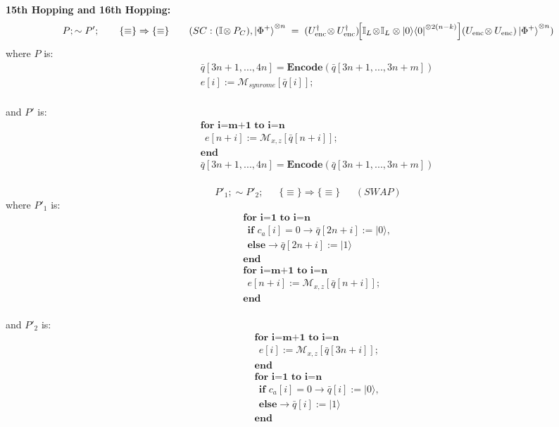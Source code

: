 \documentclass{report}
\theoremstyle{defn_style}
\begin{document}


\textbf{15th Hopping and 16th Hopping:}
$$
P; \sim P'; ~~~~~~\{\equiv\}\Rightarrow \{\equiv\}~~~~~~(SC: (\mathbb I\!\otimes P_C),\ket{\Phi^{+}}^{\otimes n}
  \;=\;
(U_{\text{enc}}^{\dagger}\!\otimes U_{\text{enc}}^{\dagger})
\!\Bigl[
    \mathbb I_L\!\otimes\!\mathbb I_L
    \otimes
    \ket{0}\!\bra{0}^{\otimes 2(n-k)}
 \Bigr]
(U_{\text{enc}}\!\otimes U_{\text{enc}})
\ket{\Phi^{+}}^{\otimes n})
$$
where $P$ is:
\begin{align*}
    \quad &\bar{q}[3n+1,...,4n]=\textbf{Encode}(\bar{q}[3n+1,...,3n+m])\\
    & e[i]:= \mathcal{M}_{synrome} [\bar{q}[i]];\\
\end{align*}

and $P'$ is:
\begin{align*}
    \quad 
    & \textbf{for i=m+1 to i=n}\\
    &~~ e[n+i]:= \mathcal{M}_{x,z} [\bar{q}[n+i]];\\
    &\textbf{end}\\
    \quad 
    &\bar{q}[3n+1,...,4n]=\textbf{Encode}(\bar{q}[3n+1,...,3n+m])\\ 
\end{align*}

$$
P'_1; \sim P'_2; ~~~~~~~\{\equiv\}\Rightarrow \{\equiv\}~~~~~~~(SWAP)
$$
where $P'_1$ is:
\begin{align*}
    \quad &\textbf{for i=1 to i=n}\\
    &~~ \textbf{if }  c_a[i] = 0 \rightarrow \bar{q}[2n+i] := |0\rangle,\\ &~~\textbf{else}   \rightarrow \bar{q}[2n+i] := |1\rangle\\
    &\textbf{end}\ \\
    & \textbf{for i=m+1 to i=n}\\
    &~~ e[n+i]:= \mathcal{M}_{x,z} [\bar{q}[n+i]];\\
    &\textbf{end}\\
\end{align*}

and $P'_2$ is:
\begin{align*}
    \quad 
    & \textbf{for~i=m+1~to~i=n}\\
    &~~ e[i]:= \mathcal{M}_{x,z} [\bar{q}[3n+i]];\\
    &\textbf{end}\\
    \quad 
    &\textbf{for i=1 to i=n}\\
    &~~ \textbf{if }  c_a[i] = 0 \rightarrow \bar{q}[i] := |0\rangle,\\ &~~\textbf{else}   \rightarrow \bar{q}[i] := |1\rangle\\
    &\textbf{end}\ \\
\end{align*}
\end{document}
